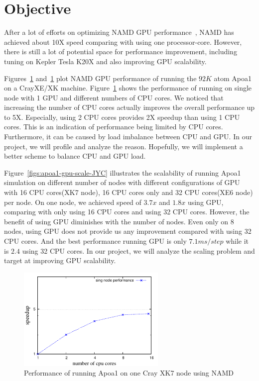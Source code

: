 \documentclass[11pt,onecolumn]{article}
\begin{document}
\section{Objective}
After a lot of efforts on optimizing NAMD GPU performance~\cite{phillips_stone_namd_cuda}, NAMD has achieved 
about 10X speed comparing with using one processor-core. However, there is still a lot of 
potential space for performance improvement, including tuning on Kepler Tesla K20X and
also improving GPU scalability.

Figures~\ref{figs:apoa1-gpu-singlenode-JYC} and~\ref{figs:apoa1-gpu-singlenode-JYC} 
plot NAMD GPU performance of running the $92K$ atom Apoa1 on a CrayXE/XK machine.
Figure~\ref{figs:apoa1-gpu-singlenode-JYC} shows the performance of running on 
single node with 1 GPU and different numbers of CPU cores. We noticed that increasing
the number of CPU cores actually improves the overall performance up to 5X. Especially, 
using 2 CPU cores provides 2X speedup than using 1 CPU cores.
This is an indication of performance being limited by CPU cores. Furthermore, 
it can be caused by load imbalance between CPU and GPU. In our project, we will profile
and analyze the reason. Hopefully, we will implement a better scheme to balance CPU and GPU load.

Figure~\ref{figs:apoa1-gpu-scale-JYC} illustrates the scalability of 
running Apoa1 simulation on different number of nodes with different configurations of 
GPU with 16 CPU cores(XK7 node), 16 CPU cores only and 32 CPU cores(XE6 node) per node.
On one node, we achieved speed of $3.7x$ and $1.8x$ using GPU, comparing with only using 16 CPU cores
and using 32 CPU cores. However, the benefit of using GPU diminishes with the number of nodes.
Even only on 8 nodes, using GPU does not provide us any improvement compared with using 32 CPU cores.
And the best performance running GPU is only $7.1ms/step$ while it is $2.4$ using 32 CPU cores.
In our project, we will analyze the scaling problem and target at improving GPU scalability.


\begin{figure}[h]
\centering
\includegraphics[width=2.8in]{figs/gpu-singlenode}
\caption{Performance of running Apoa1 on one Cray XK7 node using NAMD}
\label{figs:apoa1-gpu-singlenode-JYC}
\vspace{-0.2cm}
\end{figure}
\end{document}
